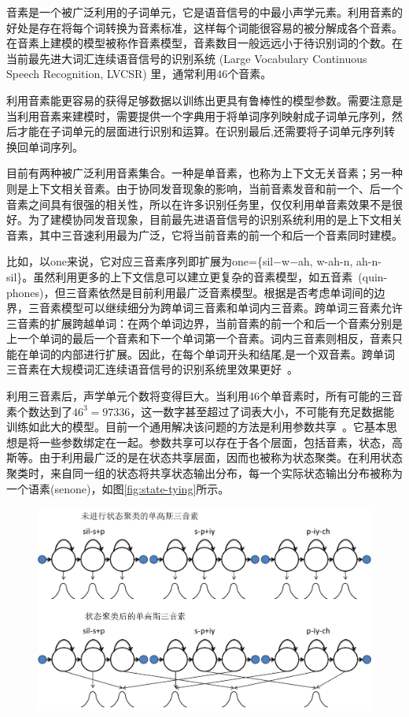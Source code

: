 音素是一个被广泛利用的子词单元，它是语音信号的中最小声学元素。利用音素的好处是存在将每个词转换为音素标准，这样每个词能很容易的被分解成各个音素。在音素上建模的模型被称作音素模型，音素数目一般远远小于待识别词的个数。在当前最先进大词汇连续语音信号的识别系统 (Large Vocabulary Continuous Speech Recognition, LVCSR) 里，通常利用46个音素。

利用音素能更容易的获得足够数据以训练出更具有鲁棒性的模型参数。需要注意是当利用音素来建模时，需要提供一个字典用于将单词序列映射成子词单元序列，然后才能在子词单元的层面进行识别和运算。在识别最后,还需要将子词单元序列转换回单词序列。

目前有两种被广泛利用音素集合。一种是单音素，也称为上下文无关音素；另一种则是上下文相关音素。由于协同发音现象的影响，当前音素发音和前一个、后一个音素之间具有很强的相关性，所以在许多识别任务里，仅仅利用单音素效果不是很好。为了建模协同发音现象，目前最先进语音信号的识别系统利用的是上下文相关音素，其中三音速利用最为广泛，它将当前音素的前一个和后一个音素同时建模。

比如，以one来说，它对应三音素序列即扩展为one=\{sil−w−ah, w-ah-n, ah-n-sil\}。虽然利用更多的上下文信息可以建立更复杂的音素模型，如五音素~\cite{hain2005automatic}(quin-phones)，但三音素依然是目前利用最广泛音素模型。根据是否考虑单词间的边界，三音素模型可以继续细分为跨单词三音素和单词内三音素。跨单词三音素允许三音素的扩展跨越单词：在两个单词边界，当前音素的前一个和后一个音素分别是上一个单词的最后一个音素和下一个单词第一个音素。词内三音素则相反，音素只能在单词的内部进行扩展。因此，在每个单词开头和结尾,是一个双音素。跨单词三音素在大规模词汇连续语音信号的识别系统里效果更好~\cite{woodland1994large}。

利用三音素后，声学单元个数将变得巨大。当利用46个单音素时，所有可能的三音素个数达到了$46^3=97336$，这一数字甚至超过了词表大小，不可能有充足数据能训练如此大的模型。目前一个通用解决该问题的方法是利用参数共享~\cite{young1993use, young1994tree}。它基本思想是将一些参数绑定在一起。参数共享可以存在于各个层面，包括音素，状态，高斯等。由于利用最广泛的是在状态共享层面，因而也被称为状态聚类。在利用状态聚类时，来自同一组的状态将共享状态输出分布，每一个实际状态输出分布被称为一个语素(senone)，如图\ref{fig:state-tying}所示。
\begin{figure}[!htp]
  \centering
    \captionstyle{\centering}
    \includegraphics[width=.8\textwidth]{figure/state.png}
\end{figure}

